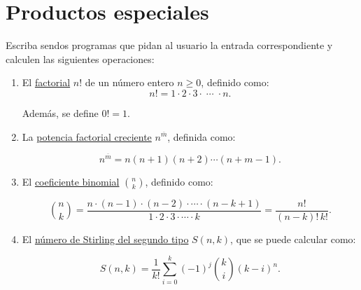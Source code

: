 \section{Productos especiales}

Escriba sendos programas que pidan al usuario la entrada correspondiente
y calculen las siguientes operaciones:

\begin{enumerate}
\item
  El \href{http://mathworld.wolfram.com/Factorial.html}{factorial} \(n!\)
  de un número entero \(n \ge 0\), definido como:
  \[n! = 1\cdot 2\cdot 3\cdot\;\cdots\;\cdot n.\]

  Además, se define \(0! = 1\).
\item
  La \href{http://mathworld.wolfram.com/RisingFactorial.html}{potencia
  factorial creciente} \(n^{\overline{m}}\), definida como:

  \[n^{\overline{m}} = n (n + 1) (n + 2) \cdots (n + m - 1).\]
\item
  El
  \href{http://mathworld.wolfram.com/BinomialCoefficient.html}{coeficiente
  binomial} \(\binom{n}{k}\), definido como:

  \[{n\choose k} =
  \frac{n\cdot (n-1)\cdot (n-2)\cdot \cdots \cdot (n-k+1)}
  {1\cdot 2\cdot 3\cdot \cdots \cdot k} =
  \frac{n!}{(n - k)!\,k!}.\]
\item
  El
  \href{http://mathworld.wolfram.com/StirlingNumberoftheSecondKind.html}{número
  de Stirling del segundo tipo} \(S(n, k)\), que se puede calcular como:

  \[S(n, k) = \frac{1}{k!}
  \sum_{i=0}^{k} (-1)^j {k\choose i} (k - i)^n.\]
\end{enumerate}
